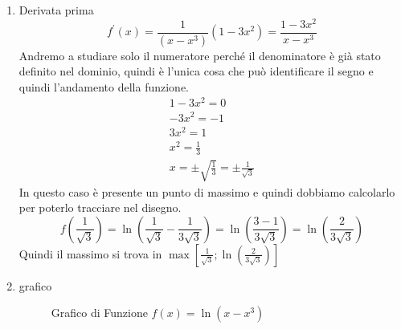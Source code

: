 \begin{enumerate}
	\item Derivata prima
	\begin{equation*}
		f^\prime(x)=\frac{1}{(x-x^3)}\left(1-3x^2\right)=\frac{1-3x^2}{x-x^3}
	\end{equation*}
	Andremo a studiare solo il numeratore perché il denominatore è già stato definito nel dominio, quindi è l'unica cosa che può identificare il segno e quindi l'andamento della funzione.
	\begin{equation}
		\begin{matrix}
			1-3x^2=0\\
			-3x^2=-1\\
			3x^2=1\\
			x^2=\frac{1}{3}\\
			x=\pm\sqrt{\frac{1}{3}}=\pm\frac{1}{\sqrt{3}}
		\end{matrix}
	\end{equation}
	In questo caso è presente un punto di massimo e quindi dobbiamo calcolarlo per poterlo tracciare nel disegno.
	\begin{equation*}
		f\left(\frac{1}{\sqrt{3}}\right)=\ln\left(\frac{1}{\sqrt{3}}-\frac{1}{3\sqrt{3}}\right)=\ln\left(\frac{3-1}{3\sqrt{3}}\right)=\ln\left(\frac{2}{3\sqrt{3}}\right)
	\end{equation*}
	Quindi il massimo si trova in $\max\left[\frac{1}{\sqrt{3}}; \ln\left(\frac{2}{3\sqrt{3}} \right) \right]$
	\item grafico
	\begin{figure}[!ht]
		\centering
		\caption{Grafico di Funzione $f(x)=\ln\left(x-x^3\right)$}
	\end{figure}
\end{enumerate}\newpage
